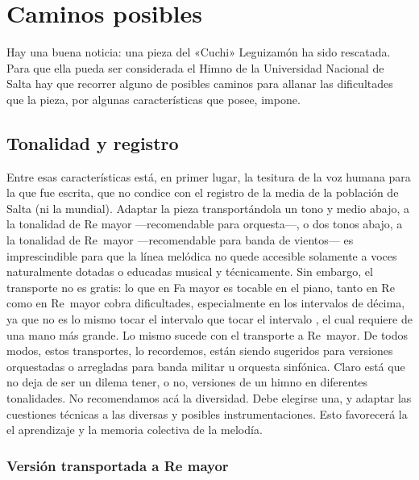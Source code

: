 \chapter{Caminos posibles}
\label{cap:caminos}

Hay una buena noticia: una pieza del «Cuchi» Leguizamón ha sido rescatada. Para que ella pueda ser considerada el Himno de la Universidad Nacional de Salta hay que recorrer alguno de posibles caminos para allanar las dificultades que la pieza, por algunas características que posee, impone.

\section{Tonalidad y registro}
\label{sec:tonalidad-registro}

Entre esas características está, en primer lugar, la tesitura de la voz humana para la que fue escrita, que no condice con el registro de la media de la población de Salta (ni la mundial). Adaptar la pieza transportándola un tono y medio abajo, a la tonalidad de Re mayor ---recomendable para orquesta---, o dos tonos abajo, a la tonalidad de Re\bemoltxt\ mayor ---recomendable para banda de vientos--- es imprescindible para que la línea melódica no quede accesible solamente a voces naturalmente dotadas o educadas musical y técnicamente. Sin embargo, el transporte no es gratis: lo que en Fa mayor es tocable en el piano, tanto en Re como en Re\bemoltxt\ mayor cobra dificultades, especialmente en los intervalos de décima, ya que no es lo mismo tocar el intervalo  que tocar el intervalo \hbox{,} el cual requiere de una mano más grande. Lo mismo sucede con el transporte a Re\bemoltxt\ mayor. De todos modos, estos transportes, lo recordemos, están siendo sugeridos para versiones orquestadas o arregladas para banda militar u orquesta sinfónica. Claro está que no deja de ser un dilema tener, o no, versiones de un himno en diferentes tonalidades. No recomendamos acá la diversidad. Debe elegirse una, y adaptar las cuestiones técnicas a las diversas y posibles instrumentaciones. Esto favorecerá la el aprendizaje y la memoria colectiva de la melodía.

\subsection{Versión transportada a Re mayor}
\label{subsec:transporte-re}

